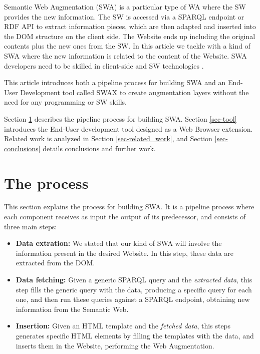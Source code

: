\documentclass[runningheads,anonymous]{llncs}
\begin{document}
Semantic Web Augmentation (SWA) is a particular type of WA where the SW provides the new information. The SW is accessed via a SPARQL endpoint or RDF API to extract information pieces, which are then adapted and inserted into the DOM structure on the client side. The Website ends up including the original contents plus the new ones from the SW. In this article we tackle with a kind of SWA where the new information is related to the content of the Website. SWA developers need to be skilled in client-side and SW technologies \cite{Rico2012AData}.

This article introduces both a pipeline process for building SWA and an End-User Development tool called SWAX to create augmentation layers without the need for any programming or SW skills.

Section \ref{sec-process} describes the pipeline process for building SWA. Section \ref{sec-tool} introduces the End-User development tool designed as a Web Browser extension. Related work is analyzed in Section \ref{sec-related_work}, and Section \ref{sec-conclusions} details conclusions and further work. 


\section{The process}
\label{sec-process}

This section explains the process for building SWA. It is a pipeline process where each component receives as input the output of its predecessor, and consists of three main steps:
\begin{itemize}
  \item \textbf{Data extration:} We stated that our kind of SWA will involve the information present in the desired Website. In this step, these data are extracted from the DOM.
  
  \item \textbf{Data fetching:} Given a generic SPARQL query and the \textit{extracted data}, this step fills the generic query with the data, producing a specific query for each one, and then run these queries against a SPARQL endpoint, obtaining new information from the Semantic Web.
  
  \item \textbf{Insertion:} Given an HTML template and the \textit{fetched data}, this steps generates specific HTML elements by filling the templates with the data, and inserts them in the Website, performing the Web Augmentation.
\end{itemize}
  
\end{document}
